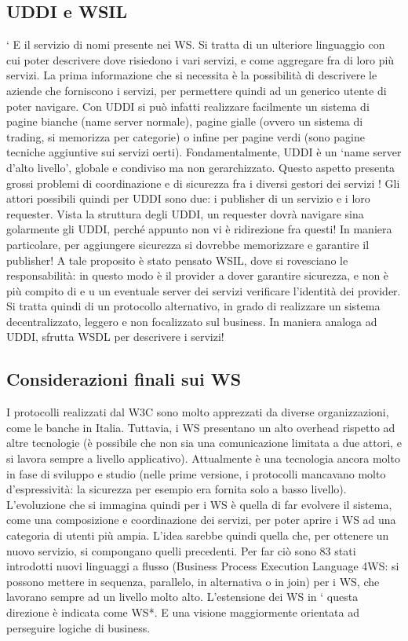 \subsection{UDDI e WSIL}
`
E il servizio di nomi presente nei WS. Si tratta di un ulteriore linguaggio con
cui poter descrivere dove risiedono i vari servizi, e come aggregare fra di loro
più servizi. La prima informazione che si necessita è la possibilità di descrivere
le aziende che forniscono i servizi, per permettere quindi ad un generico utente
di poter navigare.
Con UDDI si può infatti realizzare facilmente un sistema di pagine bianche
(name server normale), pagine gialle (ovvero un sistema di trading, si memorizza per categorie) o infine per pagine verdi
(sono pagine tecniche aggiuntive
sui servizi oerti). Fondamentalmente, UDDI è un {`}name server d'alto livello',
globale e condiviso ma non gerarchizzato. Questo aspetto presenta grossi problemi di coordinazione e di sicurezza fra i
diversi gestori dei servizi !
Gli attori possibili quindi per UDDI sono due: i publisher di un servizio e i
loro requester. Vista la struttura degli UDDI, un requester dovrà navigare sina
golarmente gli UDDI, perché appunto non vi è ridirezione fra questi! In maniera
particolare, per aggiungere sicurezza si dovrebbe memorizzare e garantire il publisher!
A tale proposito è stato pensato WSIL, dove si rovesciano le responsabilità:
in questo modo è il provider a dover garantire sicurezza, e non è più compito di
e u
un eventuale server dei servizi verificare l'identità dei provider. Si tratta quindi
di un protocollo alternativo, in grado di realizzare un sistema decentralizzato,
leggero e non focalizzato sul business. In maniera analoga ad UDDI, sfrutta
WSDL per descrivere i servizi!
\subsection{Considerazioni finali sui WS}
I protocolli realizzati dal W3C sono molto apprezzati da diverse organizzazioni,
come le banche in Italia. Tuttavia, i WS presentano un alto overhead rispetto ad
altre tecnologie (è possibile che non sia una comunicazione limitata a due attori,
e si lavora sempre a livello applicativo). Attualmente è una tecnologia ancora
molto in fase di sviluppo e studio (nelle prime versione, i protocolli mancavano
molto d'espressività: la sicurezza per esempio era fornita solo a basso livello).
L'evoluzione che si immagina quindi per i WS è quella di far evolvere il
sistema, come una composizione e coordinazione dei servizi, per poter aprire i
WS ad una categoria di utenti più ampia. L'idea sarebbe quindi quella che, per
ottenere un nuovo servizio, si compongano quelli precedenti. Per far ciò sono
83
stati introdotti nuovi linguaggi a flusso (Business Process Execution Language
4WS: si possono mettere in sequenza, parallelo, in alternativa o in join) per
i WS, che lavorano sempre ad un livello molto alto. L'estensione dei WS in
`
questa direzione è indicata come WS*. E una visione maggiormente orientata
ad perseguire logiche di business.
